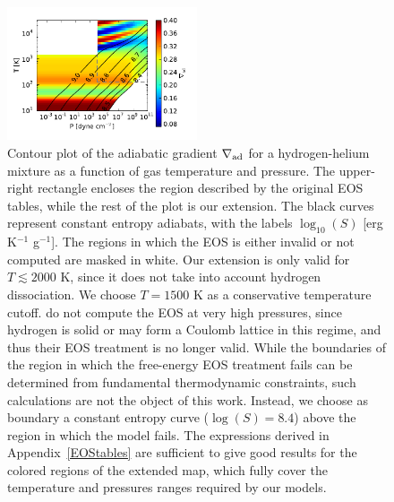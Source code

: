 \documentclass[apj]{emulateapj}
\newcommand{\delad}{\nabla_{\rm ad}}
\newcommand{\App}[1]{Appendix~\ref{#1}}
\begin{document}
\begin{figure}[h]
\centering
\includegraphics[width=0.5\textwidth]{../../figs/ModelAtmospheres/RadSelfGravRealEOS/PaperFigs/delad_S_mixt.pdf}
\caption{Contour plot of the adiabatic gradient $\delad$ for a hydrogen-helium mixture as a function of gas temperature and pressure. The upper-right rectangle encloses the region described by the original \citet{saumon95} EOS tables, while the rest of the plot is our extension. The black curves represent constant entropy adiabats, with the labels $\log_{10}(S)$ [erg K$^{-1}$ g$^{-1}$]. The regions in which the EOS is either invalid or not computed are masked in white. Our extension is only valid for $T \lesssim 2000$ K, since it does not take into account hydrogen dissociation. We choose $T=1500$ K as a conservative temperature cutoff. \citet{saumon95} do not compute the EOS at very high pressures, since hydrogen is solid or may form a Coulomb lattice in this regime, and thus their EOS treatment is no longer valid. While the boundaries of the region in which the free-energy EOS treatment fails can be determined from fundamental thermodynamic constraints, such calculations are not the object of this work. Instead, we choose as boundary a constant entropy curve ($\log(S)=8.4$) above the region in which the \citet{saumon95} model fails. The expressions derived in \App{EOStables} are sufficient to give good results for the colored regions of the extended map, which fully cover the temperature and pressures ranges required by our models.}
\label{fig:deladmap}
\end{figure}


\end{document}
